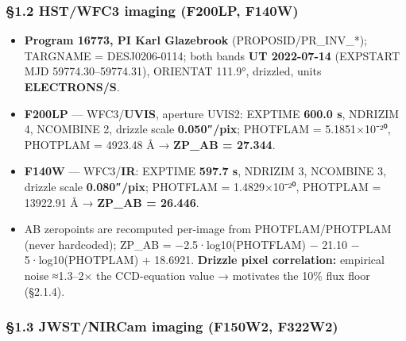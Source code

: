 \documentclass[
]{article}
\providecommand{\tightlist}{%
  \setlength{\itemsep}{0pt}\setlength{\parskip}{0pt}}
\newcommand{\BreakablePath}[1]{{\ttfamily\sloppy #1}}
\begin{document}
\hypertarget{hstwfc3-imaging-f200lp-f140w}{%
\subsubsection{§1.2 HST/WFC3 imaging (F200LP,
F140W)}\label{hstwfc3-imaging-f200lp-f140w}}

\begin{itemize}
\tightlist
\item
  \textbf{Program 16773, PI Karl Glazebrook}
  (\BreakablePath{PROPOSID}/\BreakablePath{PR\_\discretionary{}{}{}INV\_\discretionary{}{}{}*});
  \BreakablePath{TARGNAME} = DESJ0206-0114; both bands \textbf{UT
  2022-07-14} (\BreakablePath{EXPSTART} MJD 59774.30--59774.31),
  ORIENTAT 111.9°, drizzled, units \textbf{ELECTRONS/S}.
\item
  \textbf{F200LP} --- WFC3/\textbf{UVIS}, aperture UVIS2: EXPTIME
  \textbf{600.0 s}, NDRIZIM 4, NCOMBINE 2, drizzle scale
  \textbf{0.050″/pix}; \BreakablePath{PHOTFLAM} = 5.1851×10⁻²⁰,
  \BreakablePath{PHOTPLAM} = 4923.48 Å → \textbf{ZP\_AB = 27.344}.
\item
  \textbf{F140W} --- WFC3/\textbf{IR}: EXPTIME \textbf{597.7 s}, NDRIZIM
  3, NCOMBINE 3, drizzle scale \textbf{0.080″/pix};
  \BreakablePath{PHOTFLAM} = 1.4829×10⁻²⁰, \BreakablePath{PHOTPLAM} =
  13922.91 Å → \textbf{ZP\_AB = 26.446}.
\item
  AB zeropoints are recomputed per-image from
  \BreakablePath{PHOTFLAM}/\BreakablePath{PHOTPLAM} (never hardcoded);
  \BreakablePath{ZP\_\discretionary{}{}{}AB = −2.\discretionary{}{}{}5·log10(PHOTFLAM) − 21.\discretionary{}{}{}10 − 5·log10(PHOTPLAM) + 18.\discretionary{}{}{}6921}.
  \textbf{Drizzle pixel correlation:} empirical noise ≈1.3--2× the
  CCD-equation value → motivates the 10\% flux floor (§2.1.4).
\end{itemize}

\hypertarget{jwstnircam-imaging-f150w2-f322w2}{%
\subsubsection{§1.3 JWST/NIRCam imaging (F150W2,
F322W2)}\label{jwstnircam-imaging-f150w2-f322w2}}
\end{document}
